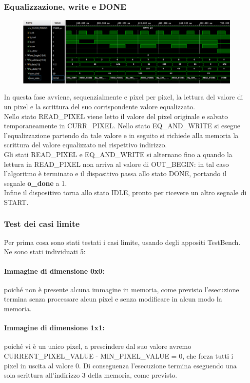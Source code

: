 \documentclass[a4paper, 12pt]{article}
\begin{document}
\vspace{3cm}
\subsubsection*{Equalizzazione, write e DONE}
\begin{figure}[h]
    \centering
    \includegraphics[trim=0cm 1.25cm 0cm 0.25cm, width=1\textwidth]{simulazioni/2x2_EWD.png}
    \label{fig:2x2_EWD}
\end{figure}
In questa fase avviene, sequenzialmente e pixel per pixel, la lettura del valore di un pixel e la scrittura del suo corrispondente valore equalizzato. \\
Nello stato READ\_PIXEL viene letto il valore del pixel originale e salvato temporaneamente in CURR\_PIXEL. Nello stato EQ\_AND\_WRITE si esegue l'equalizzazione partendo da tale valore e in seguito si richiede alla memoria la scrittura del valore equalizzato nel rispettivo indirizzo. \\
Gli stati READ\_PIXEL e EQ\_AND\_WRITE si alternano fino a quando la lettura in READ\_PIXEL non arriva al valore di OUT\_BEGIN: in tal caso l'algoritmo è terminato e il dispositivo passa allo stato DONE, portando il segnale \textbf{o\_done} a 1. \\
Infine il dispositivo torna allo stato IDLE, pronto per ricevere un altro segnale di START.

\bigskip
\subsubsection{Test dei casi limite}
Per prima cosa sono stati testati i casi limite, usando degli appositi TestBench.\\
Ne sono stati individuati 5:
\paragraph*{Immagine di dimensione 0x0:}
poiché non è presente alcuna immagine in memoria, come previsto l'esecuzione termina senza processare alcun pixel e senza modificare in alcun modo la memoria.
\paragraph*{Immagine di dimensione 1x1:}
poiché vi è un unico pixel, a prescindere dal suo valore avremo CURRENT\_PIXEL\_VALUE - MIN\_PIXEL\_VALUE = 0, che forza tutti i pixel in uscita al valore 0. Di conseguenza l'esecuzione termina eseguendo una sola scrittura all'indirizzo 3 della memoria, come previsto.
\end{document}
